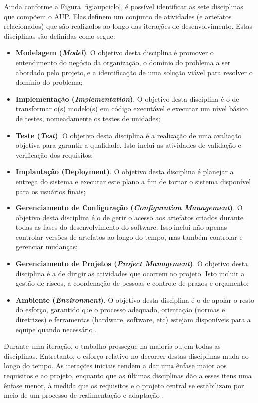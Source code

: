 Ainda conforme a Figura \ref{fig:aupciclo}, é possível identificar as sete disciplinas que compõem o AUP. Elas definem um conjunto de atividades (e artefatos relacionados) que são realizados ao longo das iterações de desenvolvimento. Estas disciplinas são definidas como segue:

\begin{itemize}
	\item \textbf{Modelagem (\textit{Model})}. O objetivo desta disciplina é promover o entendimento do negócio da organização, o domínio do problema a ser abordado pelo projeto, e a identificação de uma solução viável para resolver o domínio do problema;
	\item \textbf{Implementação (\textit{Implementation})}. O objetivo desta disciplina é o de transformar o(s) modelo(s) em código executável e executar um nível básico de testes, nomeadamente os testes de unidades;
	\item \textbf{Teste (\textit{Test})}. O objetivo desta disciplina é a realização de uma avaliação objetiva para garantir a qualidade. Isto inclui as atividades de validação e verificação dos requisitos;
	\item \textbf{Implantação (Deployment)}. O objetivo desta disciplina é planejar a entrega do sistema e executar este plano a fim de tornar o sistema disponível para os usuários finais;
	\item \textbf{Gerenciamento de Configuração (\textit{Configuration Management})}. O objetivo desta disciplina é o de gerir o acesso aos artefatos criados durante todas as fases do desenvolvimento do software. Isso inclui não apenas controlar versões de artefatos ao longo do tempo, mas também controlar e gerenciar mudanças;
	\item \textbf{Gerenciamento de Projetos (\textit{Project Management})}. O objetivo desta disciplina é a de dirigir as atividades que ocorrem no projeto. Isto incluir a gestão de riscos, a coordenação de pessoas e controle de prazos e orçamento;
	\item \textbf{Ambiente (\textit{Environment})}. O objetivo desta disciplina é o de apoiar o resto do esforço, garantido que o processo adequado, orientação (normas e diretrizes) e ferramentas (hardware, software, etc) estejam disponíveis para a equipe quando necessário \cite{Ambler:Livro}.
\end{itemize}

Durante uma iteração, o trabalho prossegue na maioria ou em todas as disciplinas. Entretanto, o esforço relativo no decorrer destas disciplinas muda ao longo do tempo. As iterações iniciais tendem a dar uma ênfase maior aos requisitos e ao projeto, enquanto que as últimas disciplinas dão a esses itens uma ênfase menor, à medida que os requisitos e o projeto central se estabilizam por meio de um processo de realimentação e adaptação \cite{Larman:Livro}.
